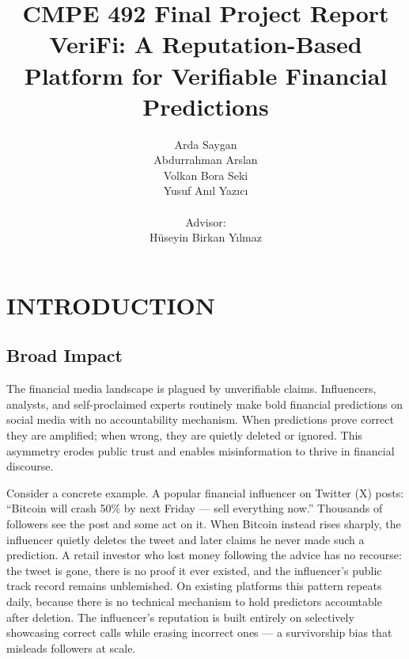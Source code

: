 \documentclass[a4paper,12pt]{report}
\begin{document}
\title{CMPE 492 Final Project Report \\ VeriFi: A Reputation-Based Platform for Verifiable Financial Predictions}
\author{
Arda Saygan \\
Abdurrahman Arslan \\
Volkan Bora Seki \\
Yusuf An\i{}l Yaz\i{}c\i{} \\ \\
Advisor: \\
H\"{u}seyin Birkan Y\i{}lmaz
}
\date{}
\maketitle{}
\tableofcontents

\chapter{INTRODUCTION}

\section{Broad Impact}

The financial media landscape is plagued by unverifiable claims. Influencers, analysts, and self-proclaimed experts routinely make bold financial predictions on social media with no accountability mechanism. When predictions prove correct they are amplified; when wrong, they are quietly deleted or ignored. This asymmetry erodes public trust and enables misinformation to thrive in financial discourse.

Consider a concrete example. A popular financial influencer on Twitter (X) posts: ``Bitcoin will crash 50\% by next Friday --- sell everything now.'' Thousands of followers see the post and some act on it. When Bitcoin instead rises sharply, the influencer quietly deletes the tweet and later claims he never made such a prediction. A retail investor who lost money following the advice has no recourse: the tweet is gone, there is no proof it ever existed, and the influencer's public track record remains unblemished. On existing platforms this pattern repeats daily, because there is no technical mechanism to hold predictors accountable after deletion. The influencer's reputation is built entirely on selectively showcasing correct calls while erasing incorrect ones --- a survivorship bias that misleads followers at scale.
\end{document}
